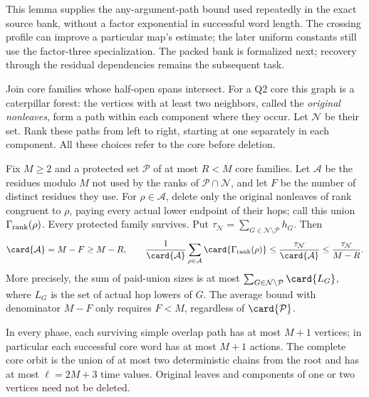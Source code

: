 This lemma supplies the any-argument-path bound used repeatedly in the
exact source bank, without a factor exponential in successful word length.
The crossing profile can improve a particular map's estimate; the later
uniform constants still use the factor-three specialization. The packed
bank is formalized next; recovery through the residual dependencies remains
the subsequent task.

\begin{lemma}
\label{lem:protected-phase}
Join core families whose half-open spans intersect. For a Q2 core this
graph is a caterpillar forest: the vertices with at least two neighbors,
called the \emph{original nonleaves}, form a path within each component
where they occur. Let $\mathcal N$ be their set. Rank these paths from
left to right, starting at one separately in each component. All these
choices refer to the core before deletion.

Fix $M\ge2$ and a protected set $\mathcal P$ of at most $R<M$ core
families. Let $\mathcal A$ be the residues modulo $M$ not used by the
ranks of $\mathcal P\cap\mathcal N$, and let $F$ be the number of
distinct residues they use. For $\rho\in\mathcal A$, delete only the
original nonleaves of rank congruent to $\rho$, paying every actual
lower endpoint of their hops; call this union $\Gamma_{\rm rank}(\rho)$.
Every protected family survives. Put
$\tau_{\mathcal N}=\sum_{G\in\mathcal N\setminus\mathcal P}h_G$.
Then
\begin{equation}\label{eq:rank-phase-average}
 \card{\mathcal A}=M-F\ge M-R,
 \qquad
 \frac1{\card{\mathcal A}}
 \sum_{\rho\in\mathcal A}\card{\Gamma_{\rm rank}(\rho)}
 \le\frac{\tau_{\mathcal N}}{\card{\mathcal A}}
 \le\frac{\tau_{\mathcal N}}{M-R}.
\end{equation}
More precisely, the sum of paid-union sizes is at most
$\sum_{G\in\mathcal N\setminus\mathcal P}\card{L_G}$, where
$L_G$ is the set of actual hop lowers of $G$. The average bound with
denominator $M-F$ only requires $F<M$, regardless of $\card{\mathcal P}$.

In every phase, each surviving simple overlap path has at most $M+1$
vertices; in particular each successful core word has at most $M+1$
actions. The complete core orbit is the union of at most two deterministic
chains from the root and has at most $\ell=2M+3$ time values. Original
leaves and components of one or two vertices need not be deleted.
\end{lemma}


